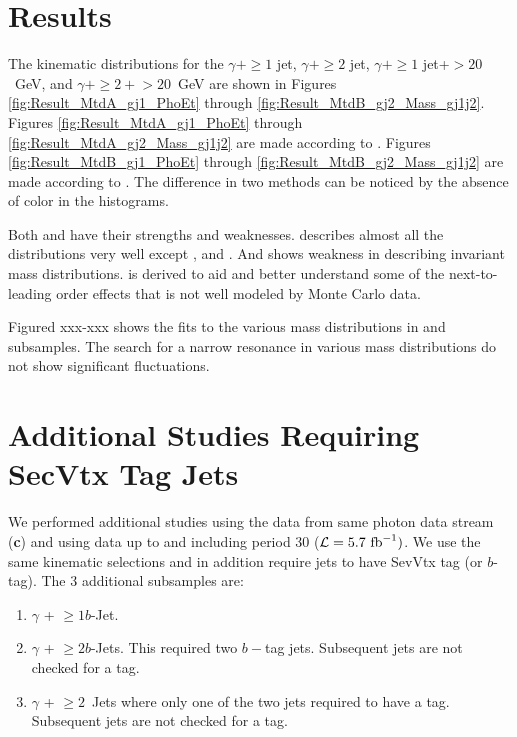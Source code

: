 \documentclass[11pt]{article}
\begin{document}
\section{Results}
The kinematic distributions for the $\gamma+\geq 1$ jet, $\gamma+\geq 2$ jet, $\gamma+\geq 1$ jet+\metCorr$>20$~GeV, and $\gamma+\geq 2+$\metCorr$>20$~GeV are shown in Figures \ref{fig:Result_MtdA_gj1_PhoEt} through \ref{fig:Result_MtdB_gj2_Mass_gj1j2}.
Figures \ref{fig:Result_MtdA_gj1_PhoEt} through \ref{fig:Result_MtdA_gj2_Mass_gj1j2} are made according to . Figures \ref{fig:Result_MtdB_gj1_PhoEt} through \ref{fig:Result_MtdB_gj2_Mass_gj1j2} are made according to . The difference in two methods can be noticed by the absence of color  in the  histograms.

Both  and  have their strengths and weaknesses.  describes almost all the distributions very well except ,  and \newterm{\met}. And  shows weakness in describing invariant mass distributions.  is derived to aid and better understand some of the next-to-leading order effects that is not well modeled by Monte Carlo data.

Figured xxx-xxx shows the fits to the various mass distributions in \phoonejet and subsamples. The search for a narrow resonance in various mass distributions do not show significant fluctuations.

\section{Additional Studies Requiring SecVtx Tag Jets}
We performed additional studies using the data from same photon data stream (\textbf{c}) and using data up to and including period 30 (${\cal L} = 5.7~\mathrm{fb}^{-1})$. We use the same kinematic selections and in addition require jets to have SevVtx tag (or $b$-tag). The 3 additional subsamples are:

\begin{enumerate}
  \item $\gamma$ + $\geq 1 b$-Jet.
  \item $\gamma$ + $\geq 2 b$-Jets. This required two $b-$tag jets. Subsequent jets are not checked for a tag.
  \item $\gamma$ + $\geq 2$~Jets where only one of the two jets required to have a tag. Subsequent jets are not checked for a tag.
\end{enumerate}
\end{document}
